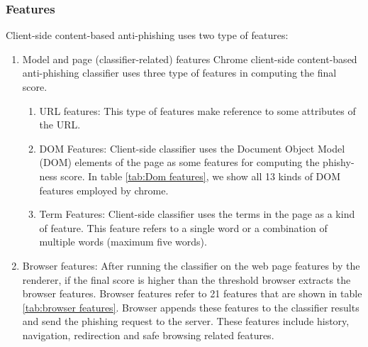 \documentclass[letterpaper,twocolumn,10pt]{article}
\begin{document}
\subsubsection{Features} 

Client-side content-based anti-phishing uses two type of features:
\begin{enumerate}
\item Model and page (classifier-related) features Chrome client-side content-based anti-phishing classifier uses three type of features in computing the final score.
    \begin{enumerate}
    \item URL features: This type of features make reference to some attributes of the URL.
    \item DOM Features: Client-side classifier uses the Document Object Model (DOM) elements of the page as some features for computing the phishy-ness score. In table \ref{tab:Dom features}, we show all 13 kinds of DOM features employed by chrome.
    \item Term Features: Client-side classifier uses the terms in the page as a kind of feature. This feature refers to a single word or a combination of multiple words (maximum five words).
\end{enumerate}
\item Browser features: After running the classifier on the web page features by the renderer, if the final score is higher than the threshold browser extracts the browser features. Browser features refer to 21 features that are shown in table \ref{tab:browser features}. Browser appends these features to the classifier results and send the phishing request to the server. These features include history, navigation, redirection and safe browsing related features.
    
\end{enumerate}

\end{document}
